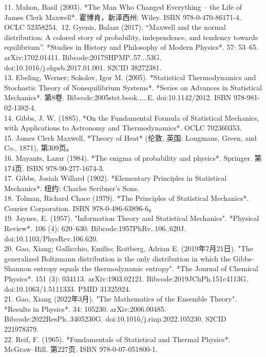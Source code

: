 11. Mahon, Basil (2003). *The Man Who Changed Everything – the Life of James Clerk Maxwell*. 霍博肯，新泽西州: Wiley. ISBN 978-0-470-86171-4. OCLC 52358254.\
12. Gyenis, Balazs (2017). “Maxwell and the normal distribution: A colored story of probability, independence, and tendency towards equilibrium”. *Studies in History and Philosophy of Modern Physics*. 57: 53–65. arXiv:1702.01411. Bibcode:2017SHPMP..57...53G. doi:10.1016/j.shpsb.2017.01.001. S2CID 38272381.\\
13. Ebeling, Werner; Sokolov, Igor M. (2005). *Statistical Thermodynamics and Stochastic Theory of Nonequilibrium Systems*. *Series on Advances in Statistical Mechanics*. 第8卷. Bibcode:2005stst.book.....E. doi:10.1142/2012. ISBN 978-981-02-1382-4.\\
14. Gibbs, J. W. (1885). *On the Fundamental Formula of Statistical Mechanics, with Applications to Astronomy and Thermodynamics*. OCLC 702360353.\\
15. James Clerk Maxwell, *Theory of Heat* (伦敦, 英国: Longmans, Green, and Co., 1871), 第309页。\\  
16. Mayants, Lazar (1984). *The enigma of probability and physics*. Springer. 第174页. ISBN 978-90-277-1674-3.\\
17. Gibbs, Josiah Willard (1902). *Elementary Principles in Statistical Mechanics*. 纽约: Charles Scribner's Sons.\\
18. Tolman, Richard Chace (1979). *The Principles of Statistical Mechanics*. Courier Corporation. ISBN 978-0-486-63896-6。\\ 
19. Jaynes, E. (1957). "Information Theory and Statistical Mechanics". *Physical Review*. 106 (4): 620–630. Bibcode:1957PhRv..106..620J. doi:10.1103/PhysRev.106.620.\\
20. Gao, Xiang; Gallicchio, Emilio; Roitberg, Adrian E. (2019年7月21日). "The generalized Boltzmann distribution is the only distribution in which the Gibbs-Shannon entropy equals the thermodynamic entropy". *The Journal of Chemical Physics*. 151 (3): 034113. arXiv:1903.02121. Bibcode:2019JChPh.151c4113G. doi:10.1063/1.5111333. PMID 31325924.\\
21. Gao, Xiang (2022年3月). "The Mathematics of the Ensemble Theory". *Results in Physics*. 34: 105230. arXiv:2006.00485. Bibcode:2022ResPh..3405230G. doi:10.1016/j.rinp.2022.105230. S2CID 221978379.\\
22. Reif, F. (1965). *Fundamentals of Statistical and Thermal Physics*. McGraw–Hill. 第227页. ISBN 978-0-07-051800-1.\\
